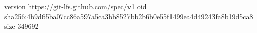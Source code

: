 version https://git-lfs.github.com/spec/v1
oid sha256:4b9d65ba07cc86a597a5ca3bb8527bb2b6b0e55f1499ea4d49243fa8b19d5ca8
size 349692
